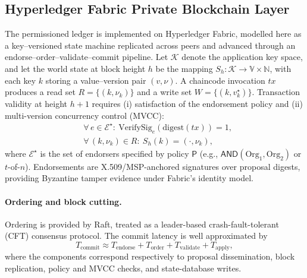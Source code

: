 \documentclass[final,5p,times,twocolumn]{elsarticle}
\begin{document}
\subsection{\textbf{Hyperledger Fabric Private Blockchain Layer}}
\label{sec:fabric}

The permissioned ledger is implemented on Hyperledger Fabric, modelled here as a key--versioned state machine replicated across peers and advanced through an endorse--order--validate--commit pipeline. Let $\mathcal{K}$ denote the application key space, and let the world state at block height $h$ be the mapping $S_h:\mathcal{K}\to\mathbb{V}\times\mathbb{N}$, with each key $k$ storing a value--version pair $(v,\nu)$. A chaincode invocation $tx$ produces a read set $R=\{(k,\nu_k)\}$ and a write set $W=\{(k,v_k^\star)\}$. Transaction validity at height $h{+}1$ requires (i) satisfaction of the endorsement policy and (ii) multi-version concurrency control (MVCC):
\begin{subequations}
\begin{align}
&\forall\,e\in\mathcal{E}^\star:\
   \mathrm{VerifySig}_e(\mathrm{digest}(tx))=1, \label{eq:fabric_endorse}\\
&\forall\,(k,\nu_k)\in R:\
   S_h(k)=(\cdot,\nu_k), \label{eq:fabric_mvcc}
\end{align}
\end{subequations}
where $\mathcal{E}^\star$ is the set of endorsers specified by policy $\mathsf{P}$ (e.g., $\mathsf{AND}(\mathrm{Org}_1,\mathrm{Org}_2)$ or $t$-of-$n$). Endorsements are X.509/MSP-anchored signatures over proposal digests, providing Byzantine tamper evidence under Fabric's identity model.

\paragraph*{\textbf{Ordering and block cutting.}}
Ordering is provided by Raft, treated as a leader-based crash-fault-tolerant (CFT) consensus protocol. The commit latency is well approximated by
\begin{equation}
T_{\mathrm{commit}}
\approx
T_{\mathrm{endorse}}
+ T_{\mathrm{order}}
+ T_{\mathrm{validate}}
+ T_{\mathrm{apply}},
\label{eq:commit_lat}
\end{equation}
where the components correspond respectively to proposal dissemination, block replication, policy and MVCC checks, and state-database writes.
\end{document}
